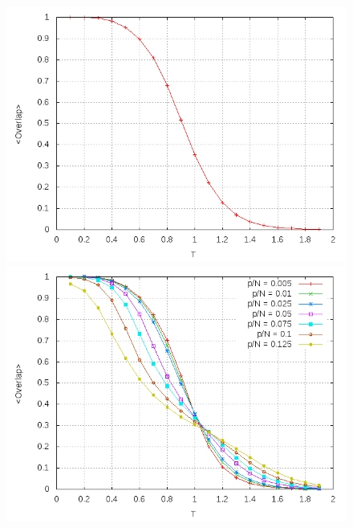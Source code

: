 \documentclass[aps,prb,onecolumn,10pt,floatfix,superscriptaddress]{article} %
\begin{document}
\begin{figure}[!htd] 
	\begin{minipage}[b]{0.450\linewidth}
   	    \includegraphics[scale=0.32 ]{Overlap2.png}
   	    \begin{center}
  \caption{\label{overlap2} .}
     	    \end{center}
   \end{minipage}
   \begin{minipage}[b]{0.450\linewidth}
   	    \includegraphics[scale=0.32 ]{Overlap_p.png}
   	     \begin{center}
  \caption{\label{overlap2b}}
     	    \end{center}
   \end{minipage} 
 \end{figure}
\end{document}
